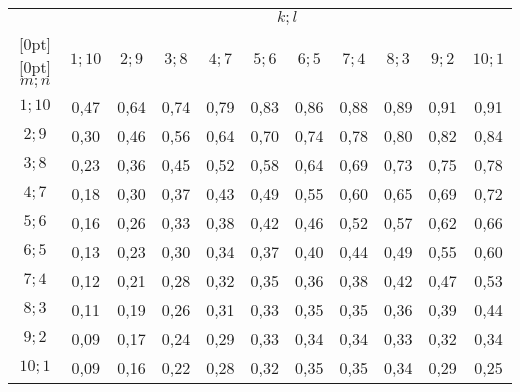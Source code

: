 \begin{multicols}{2}
\begin{table*}
\begin{center}
\begin{tabular}{|c|c|c|c|c|c|c|c|c|c|c|}
 \hline
 &\multicolumn{10}{c|}{${k;l}$}\\
 \cline{2-11}
\multicolumn{1}{|c|}{\raisebox{6pt}[0pt][0pt]{ ${m;n}$ }} & ${1; 10}$ & ${2; 9}$ & ${3; 8}$ & ${4; 7}$ & ${5; 6}$ & ${6; 5}$ & ${7; 4}$ & ${8; 3}$ & ${9; 2}$ & ${10; 1}$\\
 \hline
\hphantom{9}${1; 10}$&0,47&0,64&0,74&0,79&0,83&0,86&0,88&0,89&0,91&0,91\\
${2; 9}$&0,30&0,46&0,56&0,64&0,70&0,74&0,78&0,80&0,82&0,84\\
${3; 8}$&0,23&0,36&0,45&0,52&0,58&0,64&0,69&0,73&0,75&0,78\\
${4; 7}$&0,18&0,30&0,37&0,43&0,49&0,55&0,60&0,65&0,69&0,72\\
${5; 6}$&0,16&0,26&0,33&0,38&0,42&0,46&0,52&0,57&0,62&0,66\\
${6; 5}$&0,13&0,23&0,30&0,34&0,37&0,40&0,44&0,49&0,55&0,60\\
${7; 4}$&0,12&0,21&0,28&0,32&0,35&0,36&0,38&0,42&0,47&0,53\\
${8; 3}$&0,11&0,19&0,26&0,31&0,33&0,35&0,35&0,36&0,39&0,44\\
${9; 2}$&0,09&0,17&0,24&0,29&0,33&0,34&0,34&0,33&0,32&0,34\\
${10; 1}$\hphantom{9}&0,09&0,16&0,22&0,28&0,32&0,35&0,35&0,34&0,29&0,25\\
 \hline
 \end{tabular}
 \end{center}
 \vspace*{-16pt}
 \end{table*}

\begin{table*}\small %
\begin{center}
\vspace*{2ex}


\end{center}
\end{table*}
\end{multicols}
